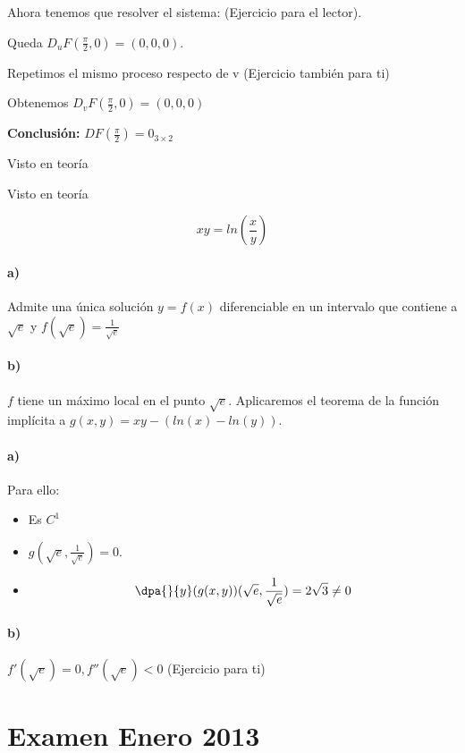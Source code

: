 \begin{problem}[19]
Ahora tenemos que resolver el sistema:
(Ejercicio para el lector). 

Queda $D_uF(\frac{\pi}{2},0)  = (0,0,0)$.

Repetimos el mismo proceso respecto de v (Ejercicio también para ti)

Obtenemos $D_vF(\frac{\pi}{2},0)  = (0,0,0)$

\textbf{Conclusión:} $DF(\frac{\pi}{2}) = 0_{3\times 2}$
\end{problem}

 \begin{problem}[20]
 \solution
 Visto en teoría
 \end{problem}
 
  \begin{problem}[21]
 \solution
 Visto en teoría
 \end{problem}
 
 
\begin{problem}[24]
\[xy = ln\left(\frac{x}{y}\right)\]
\paragraph{a)} Admite una única solución $y=f(x)$ diferenciable en un intervalo que contiene a $\sqrt{e}$ y $f(\sqrt{e}) = \frac{1}{\sqrt{e}}$
\paragraph{b)} $f$ tiene un máximo local en el punto $\sqrt{e}$.
\solution
Aplicaremos el teorema de la función implícita a $g(x,y)=xy-\left(ln(x)-ln(y)\right)$.
\paragraph{a)}
Para ello:
\begin{itemize}
\item Es $C^1$
\item $g(\sqrt{e},\frac{1}{\sqrt{e}}) = 0$.
\item
\[\dpa{}{y}(g(x,y)) (\sqrt{e},\frac{1}{\sqrt{e}}) = 2\sqrt{3}\neq 0\]
\end{itemize}

\paragraph{b)}
$f'(\sqrt{e}) = 0, f''(\sqrt{e})<0$ (Ejercicio para ti)
\end{problem}


\section{Examen Enero 2013}
